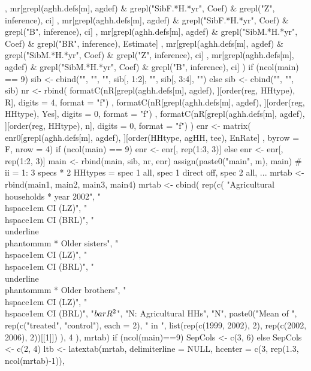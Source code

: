 \begin{Schunk}
\begin{Sinput}
{{       , 
       mr[grepl(aghh.defs[m], agdef) & grepl("SibF.*H.*yr", Coef) & grepl("Z", inference), ci]
       ,
       mr[grepl(aghh.defs[m], agdef) & grepl("SibF.*H.*yr", Coef) & grepl("B", inference), ci]
       ,
       mr[grepl(aghh.defs[m], agdef) & grepl("SibM.*H.*yr", Coef) & grepl("BR", inference), Estimate]
       , 
       mr[grepl(aghh.defs[m], agdef) & grepl("SibM.*H.*yr", Coef) & grepl("Z", inference), ci]
       ,
       mr[grepl(aghh.defs[m], agdef) & grepl("SibM.*H.*yr", Coef) & grepl("B", inference), ci]
     )
     if (ncol(main) == 9) 
       sib <- cbind("", "", "", sib[, 1:2], "", sib[, 3:4], "") else
       sib <- cbind("", "", sib)
     nr <- rbind(
        formatC(nR[grepl(aghh.defs[m], agdef), ][order(reg, HHtype), R], digits = 4, format = "f")
      , formatC(nR[grepl(aghh.defs[m], agdef), ][order(reg, HHtype), Yes], digits = 0, format = "f")
      , formatC(nR[grepl(aghh.defs[m], agdef), ][order(reg, HHtype), n], digits = 0, format = "f")
     )
     enr <- matrix(
       enr0[grepl(aghh.defs[m], agdef), ][order(HHtype, agHH, tee), EnRate]
       , byrow = F, nrow = 4)
     if (ncol(main) == 9) enr <- enr[, rep(1:3, 3)] else enr <- enr[, rep(1:2, 3)]
     main <- rbind(main, sib, nr, enr)
     assign(paste0("main", m), main)
  }
  # ii = 1: 3 specs * 2 HHtypes = spec 1 all, spec 1 direct off, spec 2 all, ...
  mrtab <- rbind(main1, main2, main3, main4)
  mrtab <- 
    cbind(
        rep(c(
          "Agricultural households * year 2002", 
          "\\hspace{1em} CI (LZ)", "\\hspace{1em} CI (BRL)", 
          "\\underline{\\phantom{mm}} * Older sisters",
          "\\hspace{1em} CI (LZ)", "\\hspace{1em} CI (BRL)", 
          "\\underline{\\phantom{mm}} * Older brothers",
          "\\hspace{1em} CI (LZ)", "\\hspace{1em} CI (BRL)", 
          "$\\bar{R}^{2}$", "N: Agricultural HHs", "N",
          paste0("Mean of ", rep(c("treated", "control"), each = 2), " in ", 
            list(rep(c(1999, 2002), 2), rep(c(2002, 2006), 2))[[1]])
           ), 4
        ), 
     mrtab)
  if (ncol(main)==9) SepCols <- c(3, 6) else SepCols <- c(2, 4) 
  ltb <- latextab(mrtab, delimiterline = NULL, 
      hcenter = c(3, rep(1.3, ncol(mrtab)-1)),
}
\end{Sinput}
\end{Schunk}
